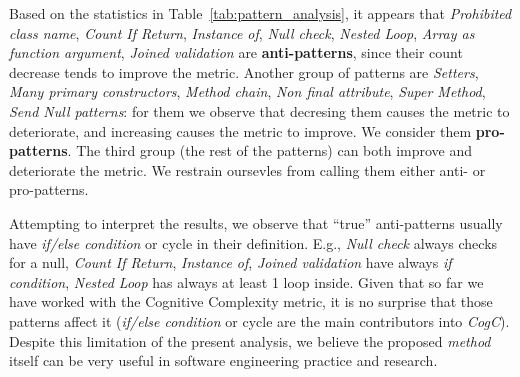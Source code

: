 \begin{table}[ht]
\end{table}

Based on the statistics in Table~\ref{tab:pattern_analysis}, it appears that \emph{Prohibited class name}, \emph{Count If Return}, \emph{Instance of}, \emph{Null check}, \emph{Nested Loop},
\emph{Array as function argument}, \emph{Joined validation} are \textbf{anti-patterns}, since their count decrease tends to improve  the metric. Another group of patterns are \emph{Setters}, \emph{Many primary constructors}, \emph{Method chain}, \emph{Non final attribute}, \emph{Super Method}, \emph{Send Null patterns}: for them we observe that decresing them causes the metric to deteriorate, and increasing causes the metric to improve. We consider them \textbf{pro-patterns}. The third group (the rest of the patterns) can both improve and deteriorate the metric. We restrain oursevles from calling them either anti- or pro-patterns.

Attempting to interpret the results, we observe that ``true'' anti-patterns usually have \emph{if/else condition} or cycle in their definition.
E.g., \emph{Null check} always checks for a null, \emph{Count If Return}, \emph{Instance of},
\emph{Joined validation} have always \emph{if condition}, \emph{Nested Loop} has always at least 1 loop inside. Given that so far we have worked with the Cognitive Complexity metric, it is no surprise that those patterns affect it (\emph{if/else condition} or cycle are the main contributors into \emph{CogC}). Despite this limitation of the present analysis, we believe the proposed \textit{method} itself can be very useful in software engineering practice and research.





